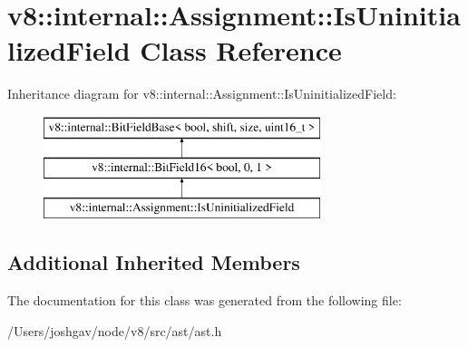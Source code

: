 \hypertarget{classv8_1_1internal_1_1_assignment_1_1_is_uninitialized_field}{}\section{v8\+:\+:internal\+:\+:Assignment\+:\+:Is\+Uninitialized\+Field Class Reference}
\label{classv8_1_1internal_1_1_assignment_1_1_is_uninitialized_field}
Inheritance diagram for v8\+:\+:internal\+:\+:Assignment\+:\+:Is\+Uninitialized\+Field\+:\begin{figure}[H]
\begin{center}
\leavevmode
\includegraphics[height=3.000000cm]{classv8_1_1internal_1_1_assignment_1_1_is_uninitialized_field}
\end{center}
\end{figure}
\subsection*{Additional Inherited Members}


The documentation for this class was generated from the following file\+:\begin{DoxyCompactItemize}
\item 
/\+Users/joshgav/node/v8/src/ast/ast.\+h\end{DoxyCompactItemize}
